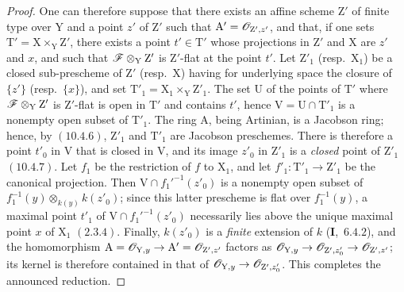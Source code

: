 \begin{proof}
One can therefore suppose that there exists an affine scheme $\mathrm{Z}'$ of finite type over $\mathrm{Y}$ and a
point $z'$ of $\mathrm{Z}'$ such that $\mathrm{A}'=\mathscr{O}_{\mathrm{Z}',z'}$, and that, if one sets $\mathrm{T}'=\mathrm{X}\times_\mathrm{Y}\mathrm{Z}'$, there exists a point
$t'\in\mathrm{T}'$ whose projections in $\mathrm{Z}'$ and $\mathrm{X}$ are $z'$ and $x$, and such that $\mathscr{F}\otimes_\mathrm{Y}\mathrm{Z}'$ is $\mathrm{Z}'$-flat at the
point $t'$. Let $\mathrm{Z}'_1$ (resp.\ $\mathrm{X}_1$) be a closed sub-prescheme of $\mathrm{Z}'$ (resp.\ $\mathrm{X}$) having for underlying space
the closure of $\{z'\}$ (resp.\ $\{x\}$), and set $\mathrm{T}'_1=\mathrm{X}_1\times_\mathrm{Y}\mathrm{Z}'_1$. The set $\mathrm{U}$ of the
points of $\mathrm{T}'$ where $\mathscr{F}\otimes_\mathrm{Y}\mathrm{Z}'$ is $\mathrm{Z}'$-flat is open in $\mathrm{T}'$  and contains $t'$, hence
$\mathrm{V}=\mathrm{U}\cap\mathrm{T}'_1$ is a nonempty open subset of $\mathrm{T}'_1$. The ring $\mathrm{A}$, being Artinian, is a Jacobson
ring; hence, by $(10.4.6)$, $\mathrm{Z}'_1$ and $\mathrm{T}'_1$ are Jacobson preschemes. There is therefore
a point $t'_0$ in $\mathrm{V}$ that is closed in $\mathrm{V}$, and its image $z'_0$ in $\mathrm{Z}'_1$ is a \emph{closed} point of $\mathrm{Z}'_1$ $(10.4.7)$.
Let $f_1$ be the restriction of $f$ to $\mathrm{X}_1$, and let $f'_1:\mathrm{T}'_1\to\mathrm{Z}'_1$ be the canonical projection. Then
$\mathrm{V}\cap f_1'^{-1}(z'_0)$ is a nonempty open subset of
$f_1^{-1}(y)\otimes_{k(y)}k(z'_0)$; since this latter prescheme is flat over $f_1^{-1}(y)$, a maximal point $t'_1$ of
$\mathrm{V}\cap f_1'^{-1}(z'_0)$ necessarily lies above the unique maximal point $x$ of $\mathrm{X}_1$ $(2.3.4)$.
Finally, $k(z'_0)$ is a \emph{finite} extension of $k$ (\textbf{I},~$6.4.2$), and the homomorphism
$\mathrm{A}=\mathscr{O}_{\mathrm{Y},y}\to\mathrm{A}'=\mathscr{O}_{\mathrm{Z}',z'}$ factors as
$\mathscr{O}_{\mathrm{Y},y}\to\mathscr{O}_{\mathrm{Z}',z'_0}\to\mathscr{O}_{\mathrm{Z}',z'}$; its kernel is therefore contained in that of
$\mathscr{O}_{\mathrm{Y},y}\to\mathscr{O}_{\mathrm{Z}',z'_0}$. This completes the announced reduction.


\end{proof}
